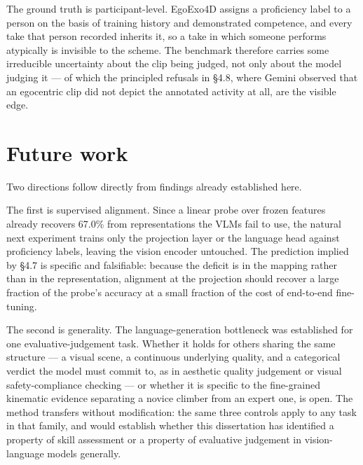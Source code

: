 The ground truth is participant-level. EgoExo4D assigns a proficiency label
to a person on the basis of training history and demonstrated competence,
and every take that person recorded inherits it, so a take in which someone
performs atypically is invisible to the scheme. The benchmark therefore
carries some irreducible uncertainty about the clip being judged, not only
about the model judging it --- of which the principled refusals in §4.8,
where Gemini observed that an egocentric clip did not depict the annotated
activity at all, are the visible edge.

\section{Future work}

Two directions follow directly from findings already established here.

The first is supervised alignment. Since a linear probe over frozen features
already recovers 67.0\% from representations the VLMs fail to use, the
natural next experiment trains only the projection layer or the language
head against proficiency labels, leaving the vision encoder untouched. The
prediction implied by §4.7 is specific and falsifiable: because the deficit
is in the mapping rather than in the representation, alignment at the
projection should recover a large fraction of the probe's accuracy at a
small fraction of the cost of end-to-end fine-tuning.

The second is generality. The language-generation bottleneck was established
for one evaluative-judgement task. Whether it holds for others sharing the
same structure --- a visual scene, a continuous underlying quality, and a
categorical verdict the model must commit to, as in aesthetic quality
judgement or visual safety-compliance checking --- or whether it is specific
to the fine-grained kinematic evidence separating a novice climber from an
expert one, is open. The method transfers without modification: the same
three controls apply to any task in that family, and would establish whether
this dissertation has identified a property of skill assessment or a
property of evaluative judgement in vision-language models generally.

